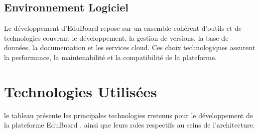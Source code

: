 \subsection{Environnement Logiciel}

Le développement d’EduBoard repose sur un ensemble cohérent d’outils et de technologies couvrant le développement, la gestion de versions, la base de données, la documentation et les services cloud. Ces choix technologiques assurent la performance, la maintenabilité et la compatibilité de la plateforme.


\section{Technologies Utilisées}
le tableau présente les principales technologies rretenus pour le développement de la plateforme EduBoard , ainsi que leurs roles respectifs au seins de l'architecture.

